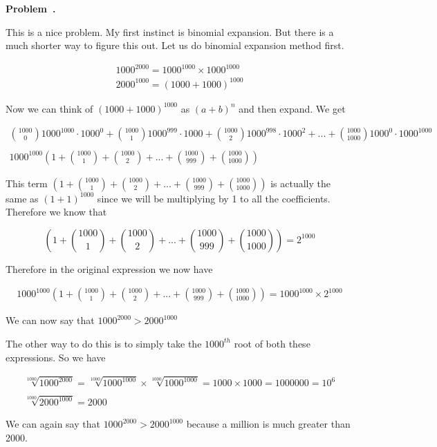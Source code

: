 \documentclass[10pt]{article}
\newcounter{problem}
\newenvironment{problem}[1][]{
  \refstepcounter{problem}
  \par\noindent\textbf{Problem~\theproblem. #1}\par
  \vspace{0.5em}
}{\vspace{1em}}
\begin{document}
\begin{problem} %
This is a nice problem. My first instinct is binomial expansion. But there is a much shorter way to figure this out. Let us do binomial expansion method first.

\begin{gather*}
  1000^{2000} = 1000^{1000} \times 1000^{1000}\\
  2000^{1000} = (1000 + 1000)^{1000}
\end{gather*}

Now we can think of $(1000 + 1000)^{1000}$ as $(a + b)^n$ and then expand. We get

\begin{gather*}
  \binom{1000}{0}1000^{1000} \cdot 1000^0 + \binom{1000}{1}1000^{999} \cdot 1000 + \binom{1000}{2}1000^{998} \cdot 1000^2 + ... + \binom{1000}{1000}1000^{0} \cdot 1000^{1000}\\\\
  1000^{1000}\left(1 + \binom{1000}{1} + \binom{1000}{2} + ... + \binom{1000}{999} +\binom{1000}{1000}\right)
\end{gather*}

This term $\left(1 + \binom{1000}{1} + \binom{1000}{2} + ... + \binom{1000}{999} +\binom{1000}{1000}\right)$ is actually the same as $(1 + 1)^{1000}$ since we will be 
multiplying by 1 to all the coefficients. Therefore we know that 

\[
\left(1 + \binom{1000}{1} + \binom{1000}{2} + ... + \binom{1000}{999} +\binom{1000}{1000}\right) = 2^{1000}
\]

Therefore in the original expression we now have

\begin{gather*}
  1000^{1000}\left(1 + \binom{1000}{1} + \binom{1000}{2} + ... + \binom{1000}{999} +\binom{1000}{1000}\right) = 1000^{1000} \times 2^{1000}
\end{gather*}

We can now say that $1000^{2000} > 2000^{1000}$


The other way to do this is to simply take the $1000^{th}$ root of both these expressions. So we have

\begin{gather*}
  \sqrt[1000]{1000^{2000}} = \sqrt[1000]{1000^{1000}} \times \sqrt[1000]{1000^{1000}} = 1000 \times 1000 = 1000000 = 10^6\\\\
  \sqrt[1000]{2000^{1000}} = 2000
\end{gather*}

We can again say that $1000^{2000} > 2000^{1000}$ because a million is much greater than 2000.
\end{problem}
\end{document}

